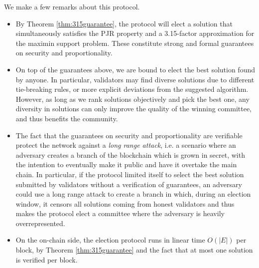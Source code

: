 We make a few remarks about this protocol. 
\begin{itemize}
\item By Theorem \ref{thm:315guarantee}, the protocol will elect a solution that simultaneously satisfies the PJR property and a 3.15-factor approximation for the maximin support problem. These constitute strong and formal guarantees on security and proportionality. 
\item On top of the guarantees above, we are bound to elect the best solution found by anyone. In particular, validators may find diverse solutions due to different tie-breaking rules, or more explicit deviations from the suggested algorithm. However, as long as we rank solutions objectively and pick the best one, any diversity in solutions can only improve the quality of the winning committee, and thus benefits the community.
\item The fact that the guarantees on security and proportionality are verifiable protect the network against a \emph{long range attack}, i.e. a scenario where an adversary creates a branch of the blockchain which is grown in secret, with the intention to eventually make it public and have it overtake the main chain. In particular, if the protocol limited itself to select the best solution submitted by validators without a verification of guarantees, an adversary could use a long range attack to create a branch in which, during an election window, it censors all solutions coming from honest validators and thus makes the protocol elect a committee where the adversary is heavily overrepresented.
\item On the on-chain side, the election protocol runs in linear time $O(|E|)$ per block, by Theorem \ref{thm:315guarantee} and the fact that at most one solution is verified per block.  
\end{itemize}


